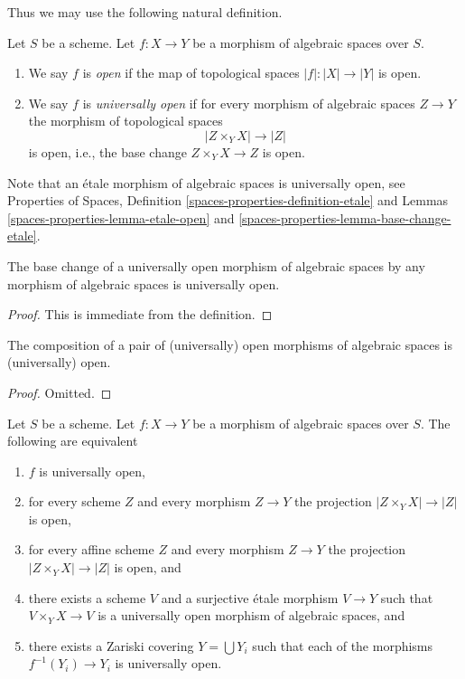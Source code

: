 \noindent
Thus we may use the following natural definition.

\begin{definition}
\label{definition-open}
Let $S$ be a scheme. Let $f : X \to Y$ be a morphism of algebraic spaces
over $S$.
\begin{enumerate}
\item We say $f$ is {\it open} if the map of topological spaces
$|f| : |X| \to |Y|$ is open.
\item We say $f$ is {\it universally open} if for every morphism
of algebraic spaces $Z \to Y$ the morphism of topological spaces
$$
|Z \times_Y X| \to |Z|
$$
is open, i.e., the base change $Z \times_Y X \to Z$ is open.
\end{enumerate}
\end{definition}

\noindent
Note that an \'etale morphism of algebraic spaces is universally open,
see
Properties of Spaces, Definition \ref{spaces-properties-definition-etale} and
Lemmas \ref{spaces-properties-lemma-etale-open} and
\ref{spaces-properties-lemma-base-change-etale}.

\begin{lemma}
\label{lemma-base-change-universally-open}
The base change of a universally open morphism of algebraic spaces
by any morphism of algebraic spaces is universally open.
\end{lemma}

\begin{proof}
This is immediate from the definition.
\end{proof}

\begin{lemma}
\label{lemma-composition-open}
The composition of a pair of (universally) open morphisms of algebraic spaces
is (universally) open.
\end{lemma}

\begin{proof}
Omitted.
\end{proof}

\begin{lemma}
\label{lemma-universally-open-local}
Let $S$ be a scheme. Let $f : X \to Y$ be a morphism of algebraic spaces
over $S$. The following are equivalent
\begin{enumerate}
\item $f$ is universally open,
\item for every scheme $Z$ and every morphism $Z \to Y$
the projection $|Z \times_Y X| \to |Z|$ is open,
\item for every affine scheme $Z$ and every morphism $Z \to Y$
the projection $|Z \times_Y X| \to |Z|$ is open, and
\item there exists a scheme $V$ and a surjective \'etale morphism
$V \to Y$ such that $V \times_Y X \to V$ is a universally open morphism
of algebraic spaces, and
\item there exists a Zariski covering $Y = \bigcup Y_i$ such that
each of the morphisms $f^{-1}(Y_i) \to Y_i$ is universally open.
\end{enumerate}
\end{lemma}

